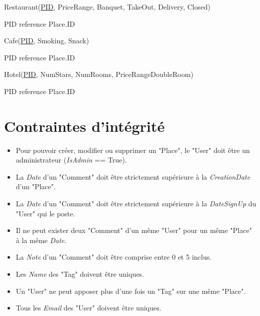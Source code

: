 \documentclass[a4paper,10pt]{article}
\begin{document}
\hspace{-0,5cm}Restaurant(\underline{PID}, PriceRange, Banquet, TakeOut, Delivery, Closed)

PID reference Place.ID

\hspace{-0,5cm}Cafe(\underline{PID}, Smoking, Snack)

PID reference Place.ID

\hspace{-0,5cm}Hotel(\underline{PID}, NumStars, NumRooms, PriceRangeDoubleRoom)

PID reference Place.ID

\section{Contraintes d'intégrité}

\begin{itemize}
  \item Pour pouvoir créer, modifier ou supprimer un "Place", le "User" doit être un administrateur (\emph{IsAdmin} == True).
  \item La \emph{Date} d'un "Comment" doit être strictement supérieure à la \emph{CreationDate} d'un "Place".
  \item La \emph{Date} d'un "Comment" doit être strictement supérieure à la \emph{DateSignUp} du "User" qui le poste.
  \item Il ne peut exister deux "Comment" d'un même "User" pour un même "Place" à la même \emph{Date}.
  \item La \emph{Note} d'un "Comment" doit être comprise entre 0 et 5 inclus.
  \item Les \emph{Name} des "Tag" doivent être uniques.
  \item Un "User" ne peut apposer plus d'une fois un "Tag" sur une même "Place".
  \item Tous les \emph{Email} des "User" doivent être uniques.
\end{itemize}
\end{document}
